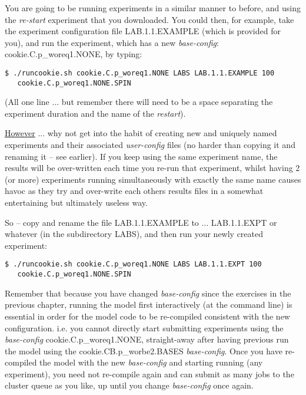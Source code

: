 \noindent You are going to be running experiments in a similar manner to before, and using the \textit{re-start} experiment that you downloaded. You could then, for example, take the experiment configuration file \textsf{\footnotesize LAB.1.1.EXAMPLE} (which is provided for you), and run the experiment, which has a new \textit{base-config}: \textsf{\footnotesize cookie.C.p\_woreq1.NONE}, by typing:
\vspace{-1mm}\small\begin{verbatim}
$ ./runcookie.sh cookie.C.p_woreq1.NONE LABS LAB.1.1.EXAMPLE 100 
   cookie.C.p_woreq1.NONE.SPIN
\end{verbatim}\normalsize
(All one line ... but remember there will need to be a space separating the experiment duration and the name of the \textit{restart}).

\noindent \uline{However} ... why not get into the habit of creating new and uniquely named experiments and their associated \textit{user-config} files (no harder than copying it and renaming it -- see earlier). If you keep using the same experiment name, the results will be over-written each time you re-run that experiment, whilst having  2 (or more) experiments running simultaneously with exactly the same name causes havoc as they try and over-write each others results files in a somewhat entertaining but ultimately useless way. 

\vspace{1mm}
So -- copy and rename the file \textsf{\footnotesize LAB.1.1.EXAMPLE} to ... \textsf{\footnotesize LAB.1.1.EXPT} or whatever (in the subdirectory \textsf{\footnotesize LABS}), and then run your newly created experiment:
\vspace{-1mm}\small\begin{verbatim}
$ ./runcookie.sh cookie.C.p_woreq1.NONE LABS LAB.1.1.EXPT 100 
   cookie.C.p_woreq1.NONE.SPIN
\end{verbatim}\normalsize

Remember that because you have changed \textit{base-config} since the exercises in the previous chapter, running the model first interactively (at the command line) is essential in order for the model code to be re-compiled consistent with the new configuration. i.e. you cannot directly start submitting experiments using the \textit{base-config} \textsf{\footnotesize cookie.C.p\_woreq1.NONE}, straight-away after having previous run the model using the \textsf{\footnotesize cookie.CB.p\_worbe2.BASES} \textit{base-config}. Once you have re-compiled the model with the new \textit{base-config} and starting running (any experiment), you need not re-compile again and can submit as many jobs to the cluster queue as you like, up until you change \textit{base-config} once again.

